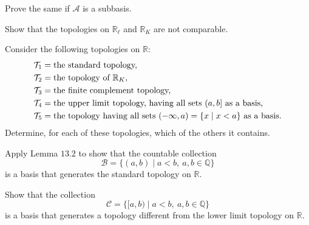 \begin{exercise}
  Prove the same if \(\mathcal{A}\) is a subbasis.
\item
  Show that the topologies on \(\mathbb{R}_{\ell}\) and \(\mathbb{R}_K\) are
  not comparable.
\item
  Consider the following topologies on \(\mathbb{R}\):
  \begin{align*}
    \mathcal{T}_1 & = \text{the standard topology,}\\
    \mathcal{T}_2 & = \text{the topology of } \mathbb{R}_K,\\
    \mathcal{T}_3 & = \text{the finite complement topology,}\\
    \mathcal{T}_4 & = \text{the upper limit topology, having all sets } (a, b]
             \text{ as a basis,}\\
    \mathcal{T}_5 & = \text{the topology having all sets }
             (-\infty, a) = \{x\mid x < a\} \text{ as a basis.}
  \end{align*}
  Determine, for each of these topologies, which of the others it contains.
\item
  \begin{exercise}[label = (\alph*)]
  \item
    Apply Lemma \(13.2\) to show that the countable collection
    \[
    \mathcal{B} = \{(a, b)\mid a < b, \ a,b\in\mathbb{Q}\}
    \]
    is a basis that generates the standard topology on \(\mathbb{R}\).
  \item
    Show that the collection
    \[
    \mathcal{C} = \{[a, b)\mid a < b, \ a,b\in\mathbb{Q}\}
    \]
    is a basis that generates a topology different from the lower limit
    topology on \(\mathbb{R}\).
  \end{exercise}
\end{exercise}

